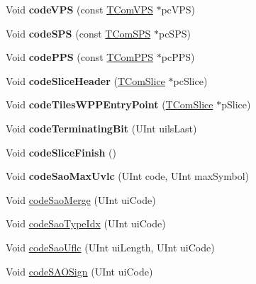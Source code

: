 \begin{DoxyCompactItemize}
\mbox{\label{class_t_enc_sbac_aed7ade7ad2192694c588a0e11f0c6fa6}} 
Void {\bfseries code\+V\+PS} (const \hyperlink{class_t_com_v_p_s}{T\+Com\+V\+PS} $\ast$pc\+V\+PS)
\item 
\mbox{\label{class_t_enc_sbac_ad617266b7c13425e66b9635ad7a15358}} 
Void {\bfseries code\+S\+PS} (const \hyperlink{class_t_com_s_p_s}{T\+Com\+S\+PS} $\ast$pc\+S\+PS)
\item 
\mbox{\label{class_t_enc_sbac_ad7353dc321674601d3c7a403cb1b01c4}} 
Void {\bfseries code\+P\+PS} (const \hyperlink{class_t_com_p_p_s}{T\+Com\+P\+PS} $\ast$pc\+P\+PS)
\item 
\mbox{\label{class_t_enc_sbac_adfd56dcce927d8b9c2af12ee8d2bdfdf}} 
Void {\bfseries code\+Slice\+Header} (\hyperlink{class_t_com_slice}{T\+Com\+Slice} $\ast$pc\+Slice)
\item 
\mbox{\label{class_t_enc_sbac_ab4d0dd1a46ed4e72825506ca48212638}} 
Void {\bfseries code\+Tiles\+W\+P\+P\+Entry\+Point} (\hyperlink{class_t_com_slice}{T\+Com\+Slice} $\ast$p\+Slice)
\item 
\mbox{\label{class_t_enc_sbac_a9d2c4a6556a224ce196005216758a746}} 
Void {\bfseries code\+Terminating\+Bit} (U\+Int uils\+Last)
\item 
\mbox{\label{class_t_enc_sbac_a4f9a3fb1c3a02f66ff16634414239615}} 
Void {\bfseries code\+Slice\+Finish} ()
\item 
\mbox{\label{class_t_enc_sbac_ad851bad79cc0c98e656bc3dcef74de67}} 
Void {\bfseries code\+Sao\+Max\+Uvlc} (U\+Int code, U\+Int max\+Symbol)
\item 
Void \hyperlink{class_t_enc_sbac_aa990cbcee1440bd3a04c6bdbf712dbb8}{code\+Sao\+Merge} (U\+Int ui\+Code)
\item 
Void \hyperlink{class_t_enc_sbac_a5fbbc6be456647da34f384d849510ea1}{code\+Sao\+Type\+Idx} (U\+Int ui\+Code)
\item 
Void \hyperlink{class_t_enc_sbac_a637015d5f4aae12d8de10c3df8f49b3c}{code\+Sao\+Uflc} (U\+Int ui\+Length, U\+Int ui\+Code)
\item 
Void \hyperlink{class_t_enc_sbac_ae2be9bb13b55341345f29e5837387409}{code\+S\+A\+O\+Sign} (U\+Int ui\+Code)

\end{DoxyCompactItemize}
